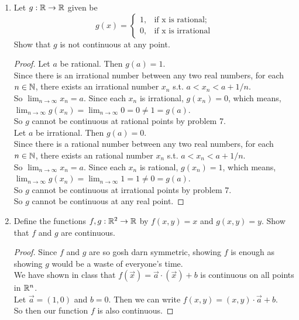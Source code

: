 \documentclass[14pt]{extarticle}
\begin{document}
\begin{enumerate}
		\item Let $g:\mathbb{R} \rightarrow \mathbb{R}$ given be 
		\begin{equation}
			g(x)=
			\begin{cases}
				1, & \text{if x is rational};\\
				0, & \text{if x is irrational}
			\end{cases}
		\end{equation}
		Show that $g$ is not continuous at any point.
		\begin{proof}
			Let $a$ be rational. Then $g(a) = 1$.\\
			Since there is an irrational number between any two real numbers, for each $n\in\mathbb{N}$, there exists an irrational number $x_n$ s.t. $a<x_n<a+1/n$.\\
			So $\lim_{n\rightarrow\infty} x_n = a$. Since each $x_n$ is irrational, $g(x_n)=0$, which means, $\lim_{n\rightarrow\infty} g(x_n) = \lim_{n\rightarrow\infty} 0 = 0 \neq 1 = g(a)$.\\
			So $g$ cannot be continuous at rational points by problem 7.\\
			Let $a$ be irrational. Then $g(a) = 0$.\\
			Since there is a rational number between any two real numbers, for each $n\in\mathbb{N}$, there exists an rational number $x_n$ s.t. $a<x_n<a+1/n$.\\
			So $\lim_{n\rightarrow\infty} x_n = a$. Since each $x_n$ is rational, $g(x_n)=1$, which means, $\lim_{n\rightarrow\infty} g(x_n) = \lim_{n\rightarrow\infty} 1 = 1 \neq 0 = g(a)$.\\
			So $g$ cannot be continuous at irrational points by problem 7.\\
			So $g$ cannot be continuous at any real point.
		\end{proof}
		
		\item Define the functions $f,g:\mathbb{R}^2 \rightarrow \mathbb{R}$ by $f(x,y) = x$ and $g(x,y) = y$. Show that $f$ and $g$ are continuous.
		\begin{proof}
			Since $f$ and $g$ are so gosh darn symmetric, showing $f$ is enough as showing $g$ would be a waste of everyone's time.\\
			We have shown in class that $f(\vec{x}) = \vec{a}\cdot(\vec{x}) + b$ is continuous on all points in $\mathbb{R}^n$.\\
			Let $\vec{a}=(1,0)$ and $b = 0$. Then we can write $f(x,y) = (x,y) \cdot \vec{a} + b$.\\
			So then our function $f$ is also continuous.
		\end{proof}
		

\end{enumerate}
\end{document}
